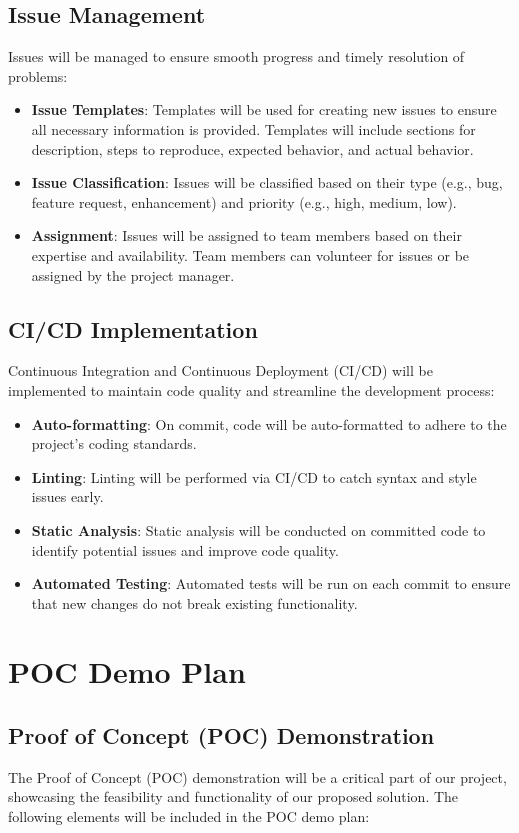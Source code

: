 \documentclass{article}
\begin{document}
\subsection{Issue Management}
Issues will be managed to ensure smooth progress and timely resolution of problems:
\begin{itemize}
    \item \textbf{Issue Templates}: Templates will be used for creating new issues to ensure all necessary information is provided. Templates will include sections for description, steps to reproduce, expected behavior, and actual behavior.
    \item \textbf{Issue Classification}: Issues will be classified based on their type (e.g., bug, feature request, enhancement) and priority (e.g., high, medium, low).
    \item \textbf{Assignment}: Issues will be assigned to team members based on their expertise and availability. Team members can volunteer for issues or be assigned by the project manager.
\end{itemize}

\subsection{CI/CD Implementation}
Continuous Integration and Continuous Deployment (CI/CD) will be implemented to maintain code quality and streamline the development process:
\begin{itemize}
    \item \textbf{Auto-formatting}: On commit, code will be auto-formatted to adhere to the project's coding standards.
    \item \textbf{Linting}: Linting will be performed via CI/CD to catch syntax and style issues early.
    \item \textbf{Static Analysis}: Static analysis will be conducted on committed code to identify potential issues and improve code quality.
    \item \textbf{Automated Testing}: Automated tests will be run on each commit to ensure that new changes do not break existing functionality.
\end{itemize}

\section{POC Demo Plan}

\subsection{Proof of Concept (POC) Demonstration}
The Proof of Concept (POC) demonstration will be a critical part of our project, showcasing the feasibility and functionality of our proposed solution. The following elements will be included in the POC demo plan:
\end{document}
